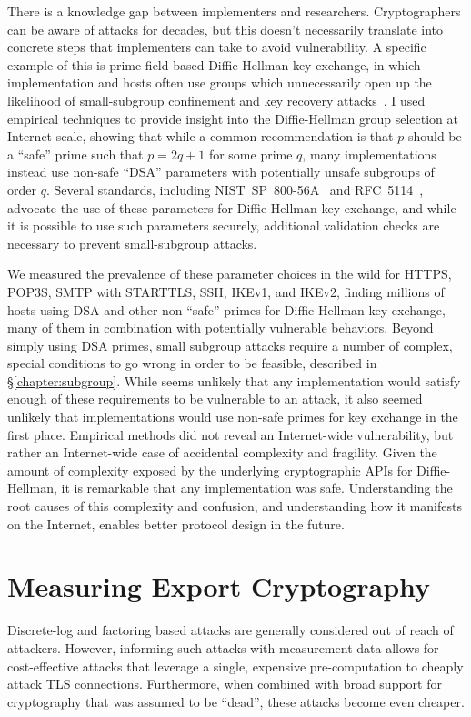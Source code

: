 There is a knowledge gap between implementers and researchers. Cryptographers
can be aware of attacks for decades, but this doesn't necessarily translate
into concrete steps that implementers can take to avoid vulnerability. A
specific example of this is prime-field based Diffie-Hellman key exchange, in
which implementation and hosts often use groups which unnecessarily open up
the likelihood of small-subgroup confinement and key recovery
attacks~\cite{subgroup-2017}. I used empirical techniques to provide insight
into the Diffie-Hellman group selection at Internet-scale, showing that while
a common recommendation is that $p$ should be a ``safe'' prime such that $p =
2q+1$ for some prime $q$, many implementations instead use non-safe ``DSA''
parameters with potentially unsafe subgroups of order $q$. Several standards,
including NIST~SP~800-56A~\cite{sp800} and RFC~5114~\cite{rfc5114}, advocate
the use of these parameters for Diffie-Hellman key exchange, and while it is
possible to use such parameters securely, additional validation checks are
necessary to prevent small-subgroup attacks.

We measured the prevalence of these parameter choices in the wild for HTTPS,
POP3S, SMTP with STARTTLS, SSH, IKEv1, and IKEv2, finding millions of hosts
using DSA and other non-``safe'' primes for Diffie-Hellman key exchange, many
of them in combination with potentially vulnerable behaviors. Beyond simply
using DSA primes, small subgroup attacks require a number of complex, special
conditions to go wrong in order to be feasible, described in
\S\ref{chapter:subgroup}. While seems unlikely that any implementation would
satisfy enough of these requirements to be vulnerable to an attack, it also
seemed unlikely that implementations would use non-safe primes for key
exchange in the first place. Empirical methods did not reveal an
Internet-wide vulnerability, but rather an Internet-wide case of accidental
complexity and fragility. Given the amount of complexity exposed by the
underlying cryptographic APIs for Diffie-Hellman, it is remarkable that any
implementation was safe. Understanding the root causes of this complexity and
confusion, and understanding how it manifests on the Internet, enables better
protocol design in the future.

\section{Measuring Export Cryptography}

Discrete-log and factoring based attacks are generally considered out of reach
of attackers.  However, informing such attacks with measurement data allows for
cost-effective attacks that leverage a single, expensive pre-computation to
cheaply attack TLS connections. Furthermore, when combined with broad support
for cryptography that was assumed to be “dead”, these attacks become even
cheaper.

